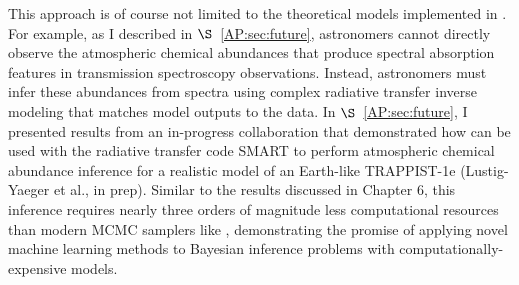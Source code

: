 This approach is of course not limited to the theoretical models implemented in \vplanet. For example, as I described in $\S$~\ref{AP:sec:future}, astronomers cannot directly observe the atmospheric chemical abundances that produce spectral absorption features in transmission spectroscopy observations. Instead, astronomers must infer these abundances from spectra using complex radiative transfer inverse modeling that matches model outputs to the data. In $\S$~\ref{AP:sec:future}, I presented results from an in-progress collaboration that demonstrated how \approxposterior can be used with the radiative transfer code SMART \citep{Meadows1996,Crisp1997} to perform atmospheric chemical abundance inference for a realistic model of an Earth-like TRAPPIST-1e (Lustig-Yaeger et al., in prep). Similar to the results discussed in Chapter 6, this inference requires nearly three orders of magnitude less computational resources than modern MCMC samplers like \emcee, demonstrating the promise of applying novel machine learning methods to Bayesian inference problems with computationally-expensive models.

